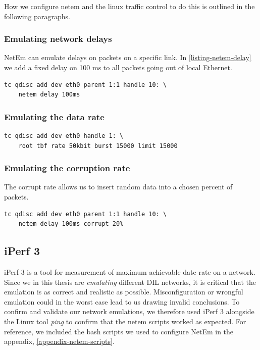 How we configure \gls{netem} and the linux traffic control to do this is
outlined in the following paragraphs.


\subsubsection{Emulating network delays}

NetEm can emulate delays on packets on a specific link. In
\cref{listing-netem-delay} we add a fixed delay on 100 ms to all packets going
out of local Ethernet.

\begin{lstlisting}[frame=single, caption="Emulating delay", label=listing-netem-delay]
  tc qdisc add dev eth0 parent 1:1 handle 10: \
    netem delay 100ms
\end{lstlisting}

\subsubsection{Emulating the data rate}

\begin{lstlisting}[frame=single, caption="Emulating data rate", label=listing-netem-data-rate]
  tc qdisc add dev eth0 handle 1: \
    root tbf rate 50kbit burst 15000 limit 15000
\end{lstlisting}

\subsubsection{Emulating the corruption rate}

The corrupt rate allows us to insert random data into a chosen percent of
packets.

\begin{lstlisting}[frame=single, caption="Emulating corruption rate", label=listing-netem-error-rate]
  tc qdisc add dev eth0 parent 1:1 handle 10: \
    netem delay 100ms corrupt 20%
\end{lstlisting}


\subsection{iPerf 3}

iPerf 3 is a tool for measurement of maximum achievable date rate on a
network\cite{iperf3-homepage}. Since we in this thesis are \textit{emulating}
different DIL networks, it is critical that the emulation is as correct and
realistic as possible. Misconfiguration or wrongful emulation could in the worst
case lead to us drawing invalid conclusions. To confirm and validate our network
emulations, we therefore used iPerf 3 alongside the Linux tool \textit{ping} to
confirm that the \gls{netem} scripts worked as expected. For reference, we
included the bash scripts we used to configure NetEm in the appendix,
\cref{appendix-netem-scripts}.

